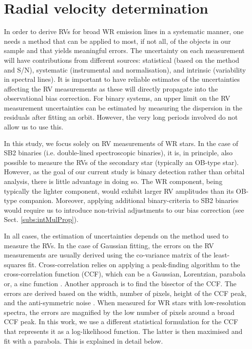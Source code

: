 \section{Radial velocity determination}
\label{sect:RVdet}

In order to derive RVs for broad WR emission lines in a systematic manner, one needs a method that can be applied to most, if not all, of the objects in our sample and that yields meaningful errors. The uncertainty on each measurement will have contributions from different sources: statistical (based on the method and S/N), systematic (instrumental and normalisation), and intrinsic (variability in spectral lines). It is important to have reliable estimates of the uncertainties affecting the RV measurements as these will directly propagate into the observational bias correction. For binary systems, an upper limit on the RV measurement uncertainties can be estimated by measuring the dispersion in the residuals after fitting an orbit. However, the very long periods involved do not allow us to use this. 

In this study, we focus solely on RV measurements of WR stars. In the case of SB2 binaries (i.e. double-lined spectroscopic binaries), it is, in principle, also possible to measure the RVs of the secondary star (typically an OB-type star). However, as the goal of our current study is binary detection rather than orbital analysis, there is little advantage in doing so. The WR component, being typically the lighter component, would exhibit larger RV amplitudes than its OB-type companion. Moreover, applying additional binary-criteria to SB2 binaries would require us to introduce non-trivial adjustments to our bias correction (see Sect. \ref{subs:intMulProp}). 

In all cases, the estimation of uncertainties depends on the method used to measure the RVs. In the case of Gaussian fitting, the errors on the RV measurements are usually derived using the co-variance matrix of the least-squares fit. Cross-correlation relies on applying a peak-finding algorithm to the cross-correlation function (CCF), which can be a Gaussian, Lorentzian, parabola or, a sinc function \citep[e.g.][]{tody_iraf_1993}. Another approach is to find the bisector of the CCF. The errors are derived based on the width, number of pixels, height of the CCF peak, and the anti-symmetric noise \citep{tonry_survey_1979}. When measured for WR stars with low-resolution spectra, the errors are magnified by the low number of pixels around a broad CCF peak. In this work, we use a different statistical formulation for the CCF that represents it as a log-likelihood function. The latter is then maximised and fit with a parabola. This is explained in detail below.
